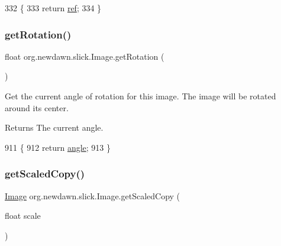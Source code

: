 \begin{DoxyCode}
332                                          \{
333         \textcolor{keywordflow}{return} \mbox{\hyperlink{classorg_1_1newdawn_1_1slick_1_1_image_a32694687591a80299d8b8ad1ea070cee}{ref}};
334     \}
\end{DoxyCode}
\mbox{\label{classorg_1_1newdawn_1_1slick_1_1_image_a6261e57f93955a59ae531403604ff156}} 
\subsubsection{\texorpdfstring{get\+Rotation()}{getRotation()}}
{\footnotesize\ttfamily float org.\+newdawn.\+slick.\+Image.\+get\+Rotation (\begin{DoxyParamCaption}{ }\end{DoxyParamCaption})\hspace{0.3cm}{\ttfamily [inline]}}

Get the current angle of rotation for this image. The image will be rotated around its center.

\begin{DoxyReturn}{Returns}
The current angle. 
\end{DoxyReturn}

\begin{DoxyCode}
911                                \{ 
912         \textcolor{keywordflow}{return} \mbox{\hyperlink{classorg_1_1newdawn_1_1slick_1_1_image_a4076b08a44e95eba2b65075342f16070}{angle}}; 
913     \} 
\end{DoxyCode}
\mbox{\label{classorg_1_1newdawn_1_1slick_1_1_image_a833a212bc085047713ad21dc246844e9}} 
\subsubsection{\texorpdfstring{get\+Scaled\+Copy()}{getScaledCopy()}\hspace{0.1cm}{\footnotesize\ttfamily [1/2]}}
{\footnotesize\ttfamily \mbox{\hyperlink{classorg_1_1newdawn_1_1slick_1_1_image}{Image}} org.\+newdawn.\+slick.\+Image.\+get\+Scaled\+Copy (\begin{DoxyParamCaption}\item[{float}]{scale }\end{DoxyParamCaption})\hspace{0.3cm}{\ttfamily [inline]}}

